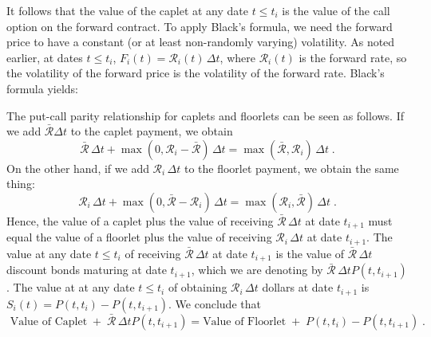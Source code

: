 It follows that the value of the caplet at any date $t\leq t_i$ is the value of the call option on the forward contract.  To apply Black's formula, we need the forward price to have a constant (or at least non-randomly varying) volatility.  As noted earlier, at dates $t\leq t_i$, $F_i(t)=\mathcal{R}_i(t)\,\varDelta t$, where $\mathcal{R}_i(t)$ is the forward rate, so the volatility of the forward price is the volatility of the forward rate. Black's formula yields:


The put-call parity relationship for caplets and floorlets can be seen as follows.  If we add $\bar{\mathcal{R}}\varDelta t$ to the caplet payment, we obtain
$$\bar{\mathcal{R}}\,\varDelta t +  \max(0,\mathcal{R}_i-\bar{\mathcal{R}})\,\varDelta t = \max( \bar{\mathcal{R}}, \mathcal{R}_i)\,\varDelta t\; .$$
On the other hand, if we add $\mathcal{R}_i\,\varDelta t$ to the floorlet payment, we obtain the same thing:
$$\mathcal{R}_i\,\varDelta t + \max(0,\bar{\mathcal{R}}-\mathcal{R}_i)\,\varDelta t = \max( \mathcal{R}_i,\bar{\mathcal{R}} )\,\varDelta t\; .$$
Hence, the value of a caplet plus the value of receiving $\bar{\mathcal{R}}\,\varDelta t$ at date $t_{i+1}$ must equal the value of a floorlet plus the value of receiving $\mathcal{R}_i\,\varDelta t$ at date $t_{i+1}$.  The value at any date $t\leq t_i$ of receiving $\bar{\mathcal{R}}\,\varDelta t$ at date $t_{i+1}$ is the value of $\bar{\mathcal{R}}\,\varDelta t$ discount bonds maturing at date $t_{i+1}$, which we are denoting by
$\bar{\mathcal{R}}\,\varDelta t P(t,t_{i+1})$.  The value at at any date $t\leq t_i$ of obtaining $\mathcal{R}_i\,\varDelta t$ dollars at date $t_{i+1}$ is  
$S_i(t) =P(t,t_i)-P(t,t_{i+1})$.  We conclude that
$$\text{ Value of Caplet} \;+ \;\bar{\mathcal{R}}\,\varDelta t P(t,t_{i+1}) = \text{Value of Floorlet} \;+\; P(t,t_i)-P(t,t_{i+1})\; .$$


